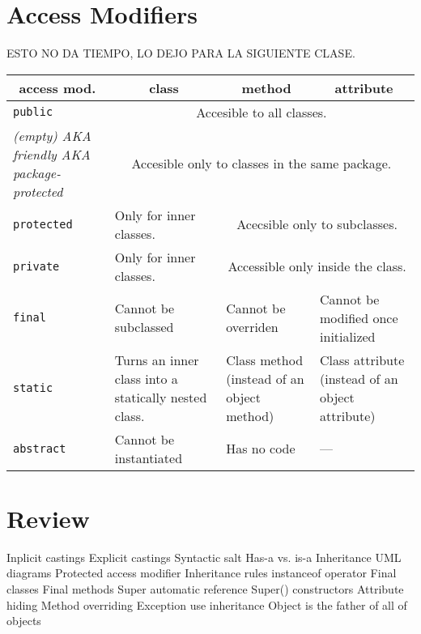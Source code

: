 \documentclass[a4paper, 9pt]{extarticle}
\begin{document}
\newpage

\section{Access Modifiers}

ESTO NO DA TIEMPO, LO DEJO PARA LA SIGUIENTE CLASE.

\begin{center}
  \begin{tabular}{|p{3cm}|p{4cm}|p{4cm}|p{4cm}|}
\hline
\multicolumn{1}{|c|}{access mod.} & \multicolumn{1}{|c|}{class} & \multicolumn{1}{|c|}{method} & \multicolumn{1}{|c|}{attribute} \\
\hline
\texttt{public}    & \multicolumn{3}{|c|}{Accesible to all classes.} \\
\hline
\textsl{(empty) AKA friendly AKA package-protected} & \multicolumn{3}{|c|}{Accesible only to classes in the same package.} \\
\hline
\texttt{protected}   & Only for inner classes. & \multicolumn{2}{|c|}{Acecsible only to subclasses.} \\
\hline
\texttt{private}     & Only for inner classes. & \multicolumn{2}{|c|}{Accessible only inside the class.} \\
\hline
\hline
\texttt{final}       & Cannot be subclassed & Cannot be overriden & Cannot be modified once initialized \\
\hline
\texttt{static}      & Turns an inner class into a statically nested class. & Class method (instead of an object method) & Class attribute (instead of an object attribute) \\
\hline
\texttt{abstract}    & Cannot be instantiated & Has no code & --- \\
\hline
\end{tabular}
\end{center}








\section{Review}

\begin{blackboard}
Inplicit castings
Explicit castings
Syntactic salt
Has-a vs. is-a
Inheritance
UML diagrams
Protected access modifier
Inheritance rules
instanceof operator
Final classes
Final methods
Super automatic reference
Super() constructors
Attribute hiding
Method overriding
Exception use inheritance
Object is the father of all of objects
\end{blackboard}
\end{document}
